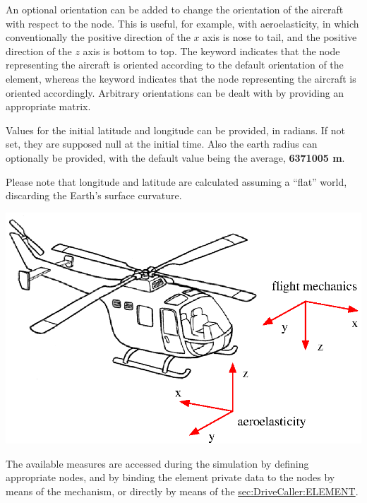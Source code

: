 An optional orientation can be added to change the orientation
of the aircraft with respect to the node.
This is useful, for example, with aeroelasticity, in which conventionally
the positive direction of the $x$ axis is nose to tail,
and the positive direction of the $z$ axis is bottom to top.
The keyword  indicates that the node representing
the aircraft is oriented according to the default orientation
of the element, whereas the keyword 
indicates that the node representing the aircraft is oriented accordingly.
Arbitrary orientations can be dealt with by providing an appropriate
 matrix.

Values for the initial latitude and longitude can be provided, in
radians. If not set, they are supposed null at the initial time. Also
the earth radius can optionally be provided, with the default value
being the average, \textbf{6371005 m}.

Please note that longitude and latitude are calculated assuming a ``flat''
world, discarding the Earth's surface curvature.

\begin{center}
\includegraphics[width=.5\textwidth]{elicottero}
\end{center}

The available measures are accessed during the simulation
by defining appropriate  nodes, and by binding
the  element private data to the nodes
by means of the  mechanism, or directly by means
of the
\hyperref{\kw{element} drive}{\kw{element} drive (see Section~}{)}{sec:DriveCaller:ELEMENT}.

